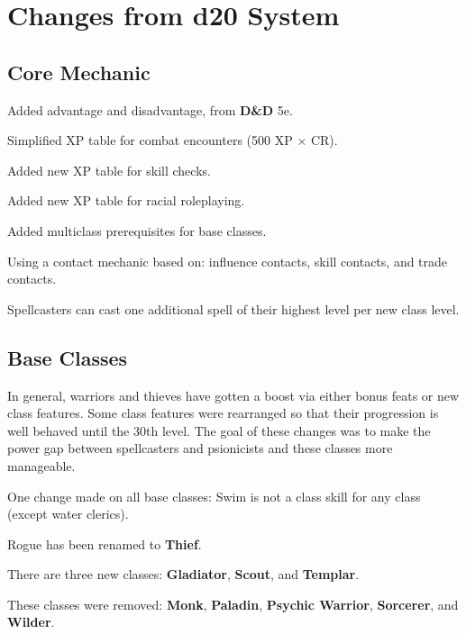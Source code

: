 \chapter{Changes from d20 System}
\label{apx:Changes from d20 System}

\section{Core Mechanic}
\begin{itemize*}
\item Added advantage and disadvantage, from \textbf{D\&D} 5e.
\item Simplified XP table for combat encounters (500 XP $\times$ CR).
\item Added new XP table for skill checks.
\item Added new XP table for racial roleplaying.
\item Added multiclass prerequisites for base classes.
\item Using a contact mechanic based on: influence contacts, skill contacts, and trade contacts.
\item Spellcasters can cast one additional spell of their highest level per new class level.
\end{itemize*}

\section{Base Classes}
In general, warriors and thieves have gotten a boost via either bonus feats or new class features. Some class features were rearranged so that their progression is well behaved until the 30th level. The goal of these changes was to make the power gap between spellcasters and psionicists and these classes more manageable.

One change made on all base classes: Swim is not a class skill for any class (except water clerics).

Rogue has been renamed to \textbf{Thief}.

There are three new classes: \textbf{Gladiator}, \textbf{Scout}, and \textbf{Templar}.

These classes were removed: \textbf{Monk}, \textbf{Paladin}, \textbf{Psychic Warrior}, \textbf{Sorcerer}, and \textbf{Wilder}.

